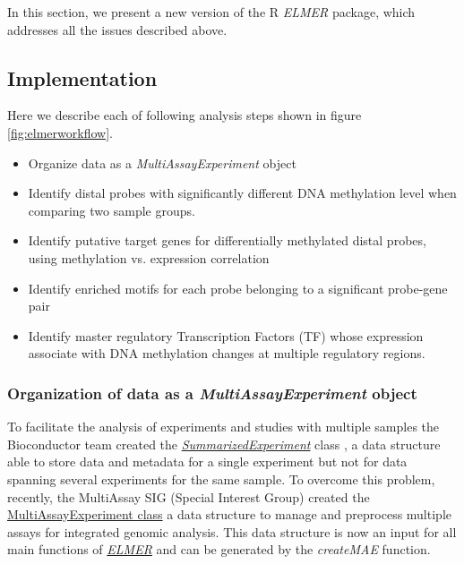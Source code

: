 In this section, we present a new version of the R \textit{ELMER} package,
which addresses all the issues described above.

\subsection{Implementation}

Here we describe each of following analysis steps shown in figure \ref{fig:elmerworkflow}.

\begin{itemize}
    \item Organize data as a \textit{MultiAssayExperiment} object
	\item Identify distal probes with significantly different DNA methylation
   level when comparing two sample groups.
	\item Identify putative target genes for differentially methylated
   distal probes, using methylation vs. expression correlation
	\item Identify enriched motifs for each probe belonging
  to a significant probe-gene pair
	\item Identify master regulatory Transcription Factors (TF)
   whose expression associate with DNA methylation changes at multiple regulatory regions.
\end{itemize}




\subsubsection{Organization of data as a \textit{MultiAssayExperiment} object}

To facilitate the analysis of experiments and studies with multiple samples
the Bioconductor team created the \href{http://bioconductor.org/packages/SummarizedExperiment/}{\textit{SummarizedExperiment}} class \cite{huber2015orchestrating}, a data structure able to store data and metadata for a single experiment but not for data spanning several experiments for the same sample. To overcome this problem, recently, the MultiAssay SIG (Special Interest Group) created the \href{http://bioconductor.org/packages/MultiAssayExperiment/}{MultiAssayExperiment class} \cite{mae2017} a data structure to manage and preprocess multiple assays for
integrated genomic analysis. This data structure is now an input for all main functions
of \href{https://github.com/tiagochst/ELMER}{\textit{ELMER}} and can be generated
by the \textit{createMAE} function.


